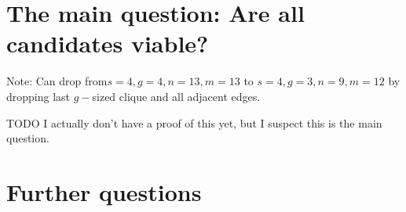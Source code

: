 \documentclass[11pt, oneside]{article} 	%
\begin{document}
\section{The main question: Are all candidates viable?}

Note: Can drop from$s=4, g=4, n=13, m=13$ to $s=4, g=3, n=9, m=12$ by dropping last $g-$sized clique and all adjacent edges.


TODO I actually don't have a proof of this yet, but I suspect this is the main question.
\section{Further questions}

\end{document}
